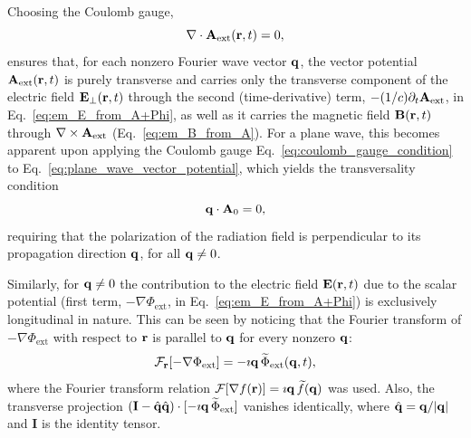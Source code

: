 Choosing  the Coulomb gauge,
\begin{equation}
  \nabla\cdot\vb A_{\mathrm{ext}}(\vb r,t)=0,
  \label{eq:coulomb_gauge_condition}
\end{equation}
ensures that, 
for each nonzero Fourier wave vector $\vb q$,
the vector potential $\vb A_{\mathrm{ext}}(\vb r,t)$ 
is purely transverse  and  carries only the transverse
component of the electric field $\vb E_{\perp}(\vb r,t)$
through the second (time-derivative) term,
$-(1/c)\partial_t\vb A_{\mathrm{ext}}$,
in Eq.~\eqref{eq:em_E_from_A+Phi}, as well as it carries  the magnetic field
$\vb B(\vb r,t)$ through
$\nabla\times\vb A_{\mathrm{ext}}$
(Eq.~\eqref{eq:em_B_from_A}).
% 
For a plane wave, this becomes apparent upon applying the Coulomb
gauge Eq.~\eqref{eq:coulomb_gauge_condition} to
Eq.~\eqref{eq:plane_wave_vector_potential}, which yields
the transversality condition
\begin{equation}
 \vb q\cdot\vb A_0=0,
 \label{eq:transversality_condition}
\end{equation}
requiring that the polarization of the radiation field is perpendicular
to its propagation direction $\vb q$, for all $\vb q\neq 0$.
%
%

Similarly, for $\vb q\ne0$ the contribution to
the electric field $\vb E(\vb r,t)$ due to the scalar
potential (first term, $-\nabla\Phi_{\mathrm{ext}}$,
in Eq.~\eqref{eq:em_E_from_A+Phi}) is exclusively longitudinal
in nature.
This can be seen by noticing that the Fourier transform
of $-\nabla\Phi_{\mathrm{ext}}$ with respect to $\vb r$
is parallel to $\vb q$ for every nonzero $\vb q$:
\[
  \mathcal F_{\vb r}[-\nabla\Phi_{\mathrm{ext}}]
  =-\imath\vb q\,\widetilde{\Phi}_{\mathrm{ext}}(\vb q,t),
\]
where the Fourier transform relation
$\mathcal F[\nabla f(\vb r)]=\imath\vb q\,\widetilde f(\vb q)$
was used.
Also, the transverse projection
$(\mathbf I-\hat{\vb q}\hat{\vb q})\cdot
[-\imath \vb q\,\widetilde{\Phi}_{\mathrm{ext}}]$
vanishes identically, where
$\hat{\vb q}=\vb q/|\vb q|$ and $\mathbf I$ is the identity tensor.



